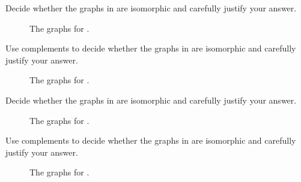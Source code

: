 \begin{exer}[\exerP] %
\label{exer_show_nonism_order5}
    Decide whether the graphs in  are isomorphic and carefully justify your answer.
        \begin{figure}[hbtp]
            \centering
            
            \caption{The graphs for .}
            \label{fig_nonism_order5}
        \end{figure}    
\end{exer}

\begin{exer}[\exerP] %
\label{exer_show_ism_K4_minus_edge}
    Use complements to decide whether the graphs in  are isomorphic and carefully justify your answer.
        \begin{figure}[hbtp]
            \centering
            
            \caption{The graphs for .}
            \label{fig_ism_K4_minus_edge}
        \end{figure}    
\end{exer}

\begin{exer}[\exerU] %
\label{exer_show_nonism_order6}
    Decide whether the graphs in  are isomorphic and carefully justify your answer.
        \begin{figure}[hbtp]
            \centering
            
            \caption{The graphs for .}
            \label{fig_nonism_order6}
        \end{figure}    
\end{exer}

\begin{exer}[\exerU] %
\label{exer_show_nonism_complicated_Ham8}
    Use complements to decide whether the graphs in  are isomorphic and carefully justify your answer.
        \begin{figure}[hbtp]
            \centering
            
            \caption{The graphs for .}
            \label{fig_nonism_complicated_Ham8}
        \end{figure}    
\end{exer}

